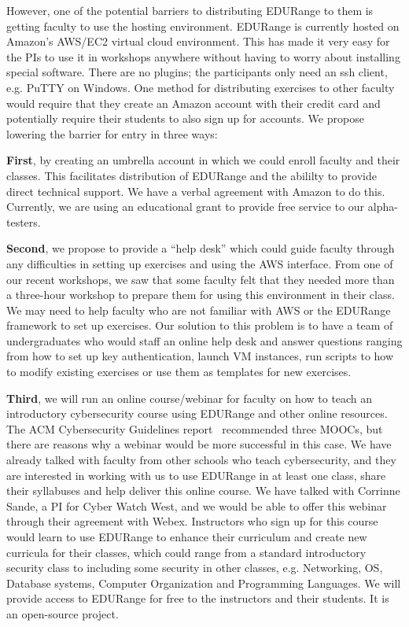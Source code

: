 However, one of the potential barriers to distributing EDURange to them is 
getting faculty to use the hosting environment.
EDURange is currently hosted on
Amazon's AWS/EC2 virtual cloud environment.  This has made it very easy for the PIs to use it in 
workshops anywhere without having to worry about installing special software.  
There are no plugins;
the participants only need an ssh client, e.g. PuTTY on Windows.  One method
 for distributing
exercises to other faculty would require that they create an Amazon account 
with their credit card and potentially 
require their students
to also sign up for accounts.  We propose lowering the barrier for entry in three ways:

{\bf First}, by creating an umbrella account in 
which we could enroll faculty and their classes.  This facilitates distribution of EDURange
and the abililty to provide direct 
technical support.  We have a verbal agreement with Amazon to do this.  Currently,
we are using an educational grant to provide free service to our alpha-testers.

{\bf Second},
we propose to provide a ``help desk'' which could guide faculty through any difficulties in setting up 
exercises and using the AWS interface.  From one of our recent workshops, we saw that 
some faculty felt that they needed more than a three-hour workshop to prepare them for using this
environment in their class.  We may need to help faculty who are not familiar with AWS 
or the EDURange
framework  to set up exercises.  Our solution to this problem is  to have a team of 
undergraduates who would staff 
an online help desk
and answer questions ranging from how to set up key authentication,
launch VM instances, run  scripts 
to how to modify existing exercises or use them as 
templates for new exercises.

{\bf Third}, we will run an online course/webinar for faculty 
on how to teach an introductory cybersecurity course using EDURange and other online resources. 
The ACM Cybersecurity Guidelines report~\cite{ACM} recommended three MOOCs, but there are reasons
why a webinar would be more successful in this case.
We have already talked with  faculty from other schools 
who teach cybersecurity, and they are interested in 
working with us to use EDURange in at least one class,
share their syllabuses and help deliver this online course.  We have talked with 
Corrinne Sande, a PI for Cyber Watch West, and we would be able to offer this 
webinar through their agreement with Webex.
Instructors who sign up for this course would learn
to use EDURange to enhance their curriculum and create new curricula for their classes, which could range from 
a standard introductory
security class to including some 
security in other classes, e.g. Networking, OS, Database systems, 
Computer Organization and Programming Languages.
We will provide access to EDURange for free to the instructors and their students.
It is an open-source project.


